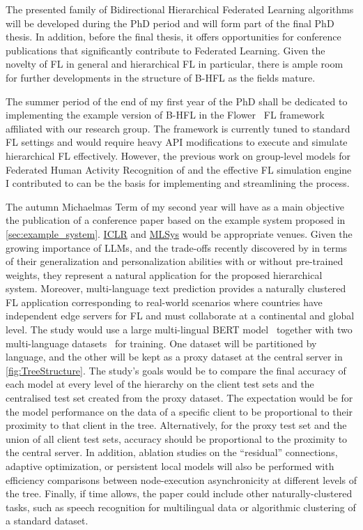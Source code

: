 The presented family of Bidirectional Hierarchical Federated Learning algorithms will be developed during the PhD period and will form part of the final PhD thesis. In addition, before the final thesis, it offers opportunities for conference publications that significantly contribute to Federated Learning. Given the novelty of FL in general and hierarchical FL in particular, there is ample room for further developments in the structure of B-HFL as the fields mature.

The summer period of the end of my first year of the PhD shall be dedicated to implementing the example version of B-HFL in the Flower~\citep{Flower} FL framework affiliated with our research group. The framework is currently tuned to standard FL settings and would require heavy API modifications to execute and simulate hierarchical FL effectively. However, the previous work on group-level models for Federated Human Activity Recognition of \citet{OperaWorkshop} and the effective FL simulation engine I contributed to can be the basis for implementing and streamlining the process.

The autumn Michaelmas Term of my second year will have as a main objective the publication of a conference paper based on the example system proposed in \cref{sec:example_system}. \href{https://iclr.cc/}{ICLR} and \href{https://mlsys.org/}{MLSys} would be appropriate venues. Given the growing importance of LLMs, and the trade-offs recently discovered by \citet{PersonalisationGeneralisationTradeoff} in terms of their generalization and personalization abilities with or without pre-trained weights, they represent a natural application for the proposed hierarchical system. Moreover, multi-language text prediction provides a naturally clustered FL application corresponding to real-world scenarios where countries have independent edge servers for FL and must collaborate at a continental and global level. The study would use a large multi-lingual BERT model~\citep{RoBERTA} together with two multi-language datasets~\citep[e.g., ][]{XGLUE,mC4} for training. One dataset will be partitioned by language, and the other will be kept as a proxy dataset at the central server in \cref{fig:TreeStructure}. The study's goals would be to compare the final accuracy of each model at every level of the hierarchy on the client test sets and the centralised test set created from the proxy dataset. The expectation would be for the model performance on the data of a specific client to be proportional to their proximity to that client in the tree. Alternatively, for the proxy test set and the union of all client test sets, accuracy should be proportional to the proximity to the central server. In addition, ablation studies on the ``residual'' connections, adaptive optimization, or persistent local models will also be performed with efficiency comparisons between node-execution asynchronicity at different levels of the tree.   Finally, if time allows, the paper could include other naturally-clustered tasks, such as speech recognition for multilingual data or algorithmic clustering of a standard dataset.

